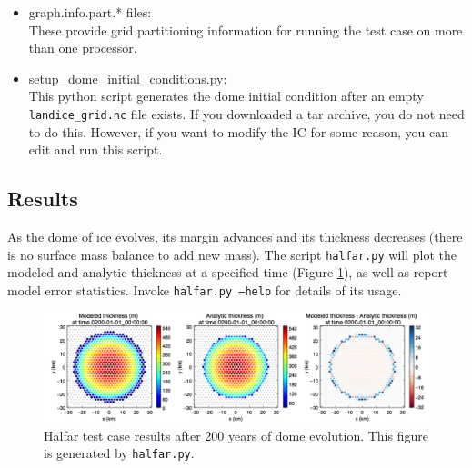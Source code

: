 \begin{itemize}

	\item graph.info.part.* files: \\ 
		These provide grid partitioning information for running the test case on more than one processor.  
		
	\item setup\_dome\_initial\_conditions.py: \\
		This python script generates the dome initial condition after an empty \texttt{landice\_grid.nc} file exists.  
		If you downloaded a tar archive, you do not need to do this.  However, if you want to modify the IC for 
		some reason, you can edit and run this script.

\end{itemize}

\subsection{Results}
\label{subsecc:halfar_results}
As the dome of ice evolves, its margin advances and its thickness decreases (there is no surface mass balance to add new mass).  The script \texttt{halfar.py} will plot the modeled and analytic thickness at a specified time (Figure \ref{fig:halfarresults}), as well as report model error statistics.  Invoke \texttt{halfar.py --help} for details of its usage.


\begin{figure}[H!]
	\centering
	\includegraphics[width=16.4cm]{landice/figures/halfar.png}
	\caption{Halfar test case results after 200 years of dome evolution. This figure is generated by \texttt{halfar.py}.}
	\label{fig:halfarresults}
\end{figure}


